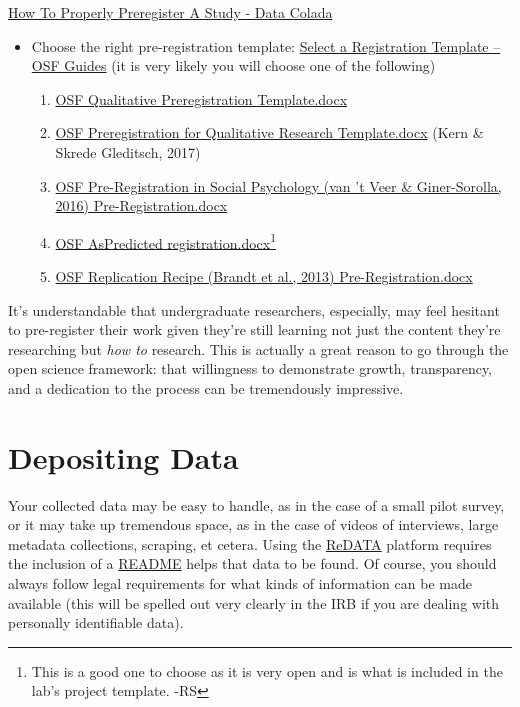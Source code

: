 \documentclass[
]{book}
\providecommand{\tightlist}{%
  \setlength{\itemsep}{0pt}\setlength{\parskip}{0pt}}
\begin{document}
\href{http://datacolada.org/64}{How To Properly Preregister A Study - Data Colada}

\begin{itemize}
\tightlist
\item
  Choose the right pre-registration template: \href{https://help.osf.io/hc/en-us/articles/360019738794-Select-a-Registration-Template}{Select a Registration Template -- OSF Guides} (it is very likely you will choose one of the following)

  \begin{enumerate}
  \def\labelenumi{\arabic{enumi}.}
  \tightlist
  \item
    \href{https://osf.io/w4ac2/}{OSF \textbar{} Qualitative Preregistration Template.docx}
  \item
    \href{https://osf.io/b6xmd/}{OSF \textbar{} Preregistration for Qualitative Research Template.docx} (Kern \& Skrede Gleditsch, 2017)
  \item
    \href{https://osf.io/ce3hr/}{OSF \textbar{} Pre-Registration in Social Psychology (van 't Veer \& Giner-Sorolla, 2016) Pre-Registration.docx}
  \item
    \href{https://osf.io/fnsb6/}{OSF \textbar{} AsPredicted registration.docx}\footnote{This is a good one to choose as it is very open and is what is included in the lab's project template. -RS}
  \item
    \href{https://osf.io/4jd46/}{OSF \textbar{} Replication Recipe (Brandt et al., 2013) Pre-Registration.docx}
  \end{enumerate}
\end{itemize}

It's understandable that undergraduate researchers, especially, may feel hesitant to pre-register their work given they're still learning not just the content they're researching but \emph{how to} research. This is actually a great reason to go through the open science framework: that willingness to demonstrate growth, transparency, and a dedication to the process can be tremendously impressive.

\hypertarget{depositing-data}{%
\section{Depositing Data}\label{depositing-data}}

Your collected data may be easy to handle, as in the case of a small pilot survey, or it may take up tremendous space, as in the case of videos of interviews, large metadata collections, scraping, et cetera. Using the \protect\hyperlink{redata}{ReDATA} platform requires the inclusion of a \href{https://osf.io/sj8xv/}{README} helps that data to be found. Of course, you should always follow legal requirements for what kinds of information can be made available (this will be spelled out very clearly in the IRB if you are dealing with personally identifiable data).
\end{document}
